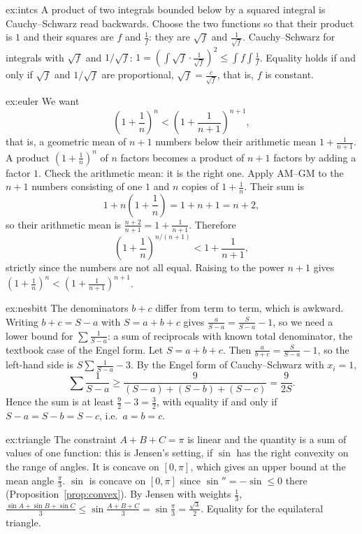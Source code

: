 \begin{solution}{ex:intcs}
\idea A product of two integrals bounded below by a squared integral is Cauchy--Schwarz read backwards. Choose the two functions so that their product is $1$ and their squares are $f$ and $\frac1f$: they are $\sqrt f$ and $\frac1{\sqrt f}$.
\writeup Cauchy--Schwarz for integrals with $\sqrt f$ and $1/\sqrt f$: $1=\left(\int\sqrt f\cdot\frac1{\sqrt f}\right)^2\le\int f\int\frac1f$.
Equality holds if and only if $\sqrt f$ and $1/\sqrt f$ are proportional, $\sqrt f=\frac c{\sqrt f}$, that is, $f$ is constant.
\end{solution}

\begin{solution}{ex:euler}
\idea We want
\[
\left(1+\frac1n\right)^n<\left(1+\frac1{n+1}\right)^{n+1},
\]
that is, a geometric mean of $n+1$ numbers below their arithmetic mean $1+\frac1{n+1}$. A product $\left(1+\frac1n\right)^n$ of $n$ factors becomes a product of $n+1$ factors by adding a factor $1$. Check the arithmetic mean: it is the right one.
\writeup Apply AM--GM to the $n+1$ numbers consisting of one $1$ and $n$ copies of $1+\frac1n$. Their sum is
\[
1+n\left(1+\frac1n\right)=1+n+1=n+2,
\]
so their arithmetic mean is $\frac{n+2}{n+1}=1+\frac1{n+1}$. Therefore
\[
\left(1+\frac1n\right)^{n/(n+1)}<1+\frac1{n+1},
\]
strictly since the numbers are not all equal. Raising to the power $n+1$ gives $\left(1+\frac1n\right)^n<\left(1+\frac1{n+1}\right)^{n+1}$.
\end{solution}

\begin{solution}{ex:nesbitt}
\idea The denominators $b+c$ differ from term to term, which is awkward. Writing $b+c=S-a$ with $S=a+b+c$ gives $\frac a{S-a}=\frac S{S-a}-1$, so we need a lower bound for $\sum\frac1{S-a}$: a sum of reciprocals with known total denominator, the textbook case of the Engel form.
\writeup Let $S=a+b+c$. Then $\frac a{b+c}=\frac S{S-a}-1$, so the left-hand side is $S\sum\frac1{S-a}-3$. By the Engel form of Cauchy--Schwarz
with $x_i=1$,
\[
\sum\frac1{S-a}\ge\frac9{(S-a)+(S-b)+(S-c)}=\frac9{2S}.
\]
Hence the sum is at least $\frac92-3=\frac32$, with equality if and only if $S-a=S-b=S-c$, i.e.\ $a=b=c$.
\end{solution}

\begin{solution}{ex:triangle}
\idea The constraint $A+B+C=\pi$ is linear and the quantity is a sum of values of one function: this is Jensen's setting, if $\sin$ has the right convexity on the range of angles. It is concave on $[0,\pi]$, which gives an upper bound at the mean angle $\frac\pi3$.
\writeup $\sin$ is concave on $[0,\pi]$ since $\sin''=-\sin\le0$ there (Proposition~\ref{prop:convex}). By Jensen with weights $\frac13$,
$\frac{\sin A+\sin B+\sin C}3\le\sin\frac{A+B+C}3=\sin\frac\pi3=\frac{\sqrt3}2$. Equality for the equilateral triangle.
\end{solution}

